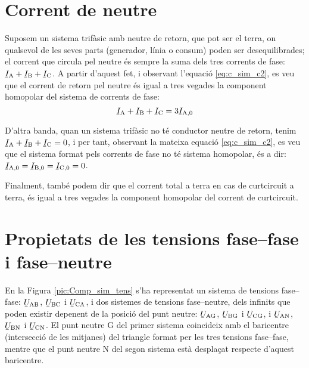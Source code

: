 \section{Corrent de neutre}\label{sec:corrent-neutre}

Suposem un sistema trifàsic amb neutre de retorn, que pot ser el
terra, on qualsevol de les seves parts (generador, línia o consum)
poden ser desequilibrades; el corrent que circula pel neutre és
sempre la suma dels tres corrents de fase: $\cmplx{I}\ped{A}+
\cmplx{I}\ped{B}+\cmplx{I}\ped{C}$. A partir d'aquest fet, i
observant l'equació \eqref{eq:c_sim_c2}, es veu que el corrent de
retorn pel neutre és igual a tres vegades la component homopolar
del sistema de corrents de fase:
\begin{equation}
    \cmplx{I}\ped{A}+\cmplx{I}\ped{B}+\cmplx{I}\ped{C} =3 \cmplx{I}\ped{A,0}
\end{equation}

D'altra banda, quan un sistema trifàsic no té conductor neutre de retorn, tenim
$\cmplx{I}\ped{A}+ \cmplx{I}\ped{B}+\cmplx{I}\ped{C}=0$, i per tant,
observant la mateixa equació \eqref{eq:c_sim_c2}, es veu que el
sistema format pels corrents de fase no té sistema homopolar, és a dir: $\cmplx{I}\ped{A,0}=\cmplx{I}\ped{B,0}=\cmplx{I}\ped{C,0}=0$.

Finalment, també podem dir que el corrent total a terra en cas de
curtcircuit a terra, és igual a tres vegades la component homopolar del
corrent de curtcircuit.

\section{Propietats de les tensions fase--fase i fase--neutre}\label{sec:comp-sim-neutre}
 

En la Figura \vref{pic:Comp_sim_tens} s'ha representat un sistema de
tensions fase--fase: $\cmplx{U}\ped{AB}$,
$\cmplx{U}\ped{BC}$ i $\cmplx{U}\ped{CA}$, i dos
sistemes de tensions fase--neutre, dels infinits que poden existir
depenent de la posició del punt neutre: $\cmplx{U}\ped{AG}$,
$\cmplx{U}\ped{BG}$ i $\cmplx{U}\ped{CG}$, i
$\cmplx{U}\ped{AN}$, $\cmplx{U}\ped{BN}$ i
$\cmplx{U}\ped{CN}$. El punt neutre G del primer sistema
coincideix amb el baricentre (intersecció de les mitjanes) del
triangle  format per les tres tensions fase--fase, mentre que el
punt neutre N del segon sistema està desplaçat respecte
d'aquest baricentre.


